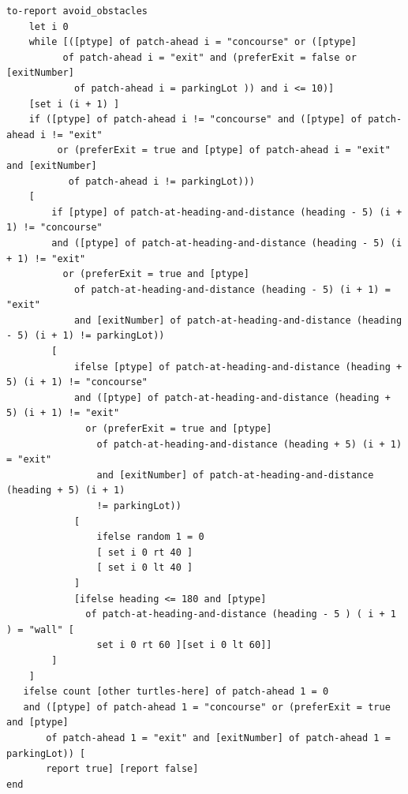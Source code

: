 \documentclass{article}
\begin{document}
\begin{lstlisting}
to-report avoid_obstacles
    let i 0
    while [([ptype] of patch-ahead i = "concourse" or ([ptype] 
          of patch-ahead i = "exit" and (preferExit = false or [exitNumber] 
            of patch-ahead i = parkingLot )) and i <= 10)]
    [set i (i + 1) ]
    if ([ptype] of patch-ahead i != "concourse" and ([ptype] of patch-ahead i != "exit"
         or (preferExit = true and [ptype] of patch-ahead i = "exit" and [exitNumber] 
           of patch-ahead i != parkingLot)))
    [
        if [ptype] of patch-at-heading-and-distance (heading - 5) (i + 1) != "concourse" 
        and ([ptype] of patch-at-heading-and-distance (heading - 5) (i + 1) != "exit" 
          or (preferExit = true and [ptype] 
            of patch-at-heading-and-distance (heading - 5) (i + 1) = "exit" 
            and [exitNumber] of patch-at-heading-and-distance (heading - 5) (i + 1) != parkingLot))
        [
            ifelse [ptype] of patch-at-heading-and-distance (heading + 5) (i + 1) != "concourse" 
            and ([ptype] of patch-at-heading-and-distance (heading + 5) (i + 1) != "exit" 
              or (preferExit = true and [ptype] 
                of patch-at-heading-and-distance (heading + 5) (i + 1) = "exit" 
                and [exitNumber] of patch-at-heading-and-distance (heading + 5) (i + 1) 
                != parkingLot))
            [ 
                ifelse random 1 = 0
                [ set i 0 rt 40 ]
                [ set i 0 lt 40 ]
            ]
            [ifelse heading <= 180 and [ptype] 
              of patch-at-heading-and-distance (heading - 5 ) ( i + 1 ) = "wall" [
                set i 0 rt 60 ][set i 0 lt 60]]
        ]
    ]
   ifelse count [other turtles-here] of patch-ahead 1 = 0  
   and ([ptype] of patch-ahead 1 = "concourse" or (preferExit = true and [ptype] 
       of patch-ahead 1 = "exit" and [exitNumber] of patch-ahead 1 = parkingLot)) [
       report true] [report false]
end


\end{lstlisting}
\end{document}
